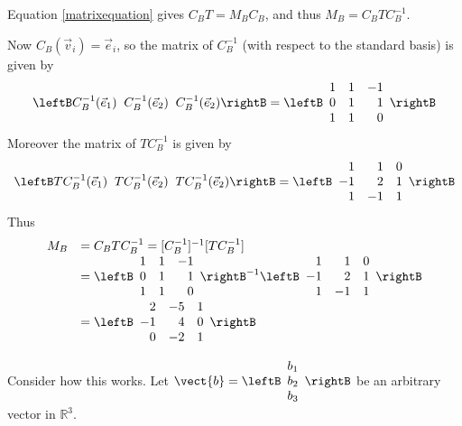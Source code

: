 \begin{solution}

Equation  \ref{matrixequation}  gives $ C_BT=M_{B}C_B$, and thus 
$M_{B} = C_BTC^{-1}_B$. 

Now $C_B(\vec{v}_i) = \vec{e}_i$, so the matrix of $C_B^{-1}$ (with respect to the standard basis) is given by
\[ \leftB  C_B^{-1}(\vec{e}_1) \;\; C_B^{-1}(\vec{e}_2) \;\; C_B^{-1}(\vec{e}_2) \rightB =  
\leftB 
\begin{array}{rrr}
1 & 1 & -1 \\ 
0 & 1 & 1 \\ 
1 & 1 & 0
\end{array}
\rightB
\]
Moreover the matrix of  $T C_B^{-1}$ is given by 
\[ \leftB  TC_B^{-1}(\vec{e}_1) \;\; TC_B^{-1}(\vec{e}_2) \;\; TC_B^{-1}(\vec{e}_2) \rightB =  
\leftB
\begin{array}{rrr}
1 & 1 & 0 \\ 
-1 & 2 & 1 \\ 
1 & -1 & 1
\end{array}
\rightB
\]
Thus 
\[ \begin{array}{ll}
M_{B} & =  C_BTC^{-1}_B =  [C^{-1}_B]^{-1} [TC^{-1}_B] \\
	& = 
\leftB
\begin{array}{rrr}
1 & 1 & -1 \\ 
0 & 1 & 1 \\ 
1 & 1 & 0
\end{array}
\rightB ^{-1}\leftB 
\begin{array}{rrr}
1 & 1 & 0 \\ 
-1 & 2 & 1 \\ 
1 & -1 & 1
\end{array}
\rightB \\
&=\leftB 
\begin{array}{rrr}
2 & -5 & 1 \\ 
-1 & 4 & 0 \\ 
0 & -2 & 1
\end{array}
\rightB
\end{array}
\]

Consider how this works. Let $\vect{b} = \leftB
\begin{array}{r}
b_1 \\
b_2 \\
b_3
\end{array}
\rightB$ be an arbitrary vector in $\mathbb{R}^3$. 


\end{solution}

